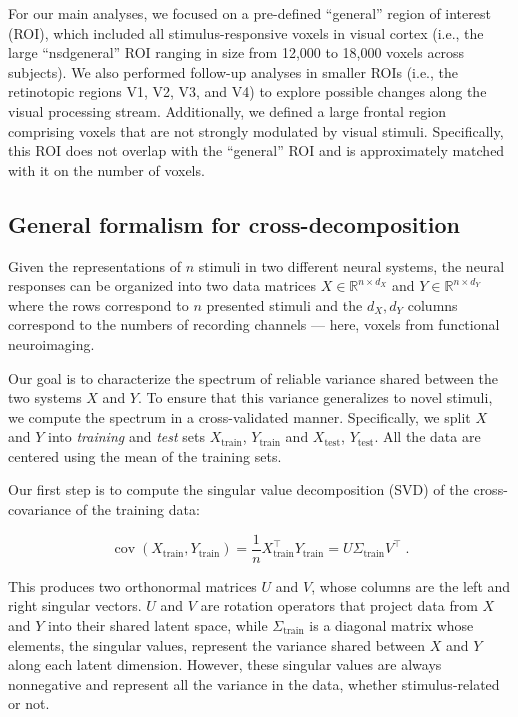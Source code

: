 \documentclass[10pt]{article}
\begin{document}
For our main analyses, we focused on a pre-defined ``general'' region of interest (ROI), which included all stimulus-responsive voxels in visual cortex (i.e., the large ``nsdgeneral'' ROI ranging in size from 12,000 to 18,000 voxels across subjects). We also performed follow-up analyses in smaller ROIs (i.e., the retinotopic regions V1, V2, V3, and V4) to explore possible changes along the visual processing stream. Additionally, we defined a large frontal region comprising voxels that are not strongly modulated by visual stimuli. Specifically, this ROI does not overlap with the ``general'' ROI and is approximately matched with it on the number of voxels.

\subsection{General formalism for cross-decomposition}\label{general-formalism-for-cross-decomposition}

Given the representations of \(n\) stimuli in two different neural systems, the neural responses can be organized into two data matrices \(X \in \mathbb{R}^{n \times d_X}\) and \(Y \in \mathbb{R}^{n \times d_Y}\) where the rows correspond to \(n\) presented stimuli and the \(d_X, d_Y\) columns correspond to the numbers of recording channels --- here, voxels from functional neuroimaging.

Our goal is to characterize the spectrum of reliable variance shared between the two systems \(X\) and \(Y\). To ensure that this variance generalizes to novel stimuli, we compute the spectrum in a cross-validated manner. Specifically, we split \(X\) and \(Y\) into \emph{training} and \emph{test} sets \(X_\text{train}\), \(Y_\text{train}\) and \(X_\text{test}\), \(Y_\text{test}\). All the data are centered using the mean of the training sets.

Our first step is to compute the singular value decomposition (SVD) of the cross-covariance of the training data:

\[
\operatorname{cov}
\left(X_\text{train}, Y_\text{train}\right) = \frac{1}{n} X_\text{train}^\top Y_\text{train} = U \Sigma_\text{train} V^\top\;.
\]

This produces two orthonormal matrices \(U\) and \(V\), whose columns are the left and right singular vectors. \(U\) and \(V\) are rotation operators that project data from \(X\) and \(Y\) into their shared latent space, while \(\Sigma_\text{train}\) is a diagonal matrix whose elements, the singular values, represent the variance shared between \(X\) and \(Y\) along each latent dimension. However, these singular values are always nonnegative and represent all the variance in the data, whether stimulus-related or not.
\end{document}
